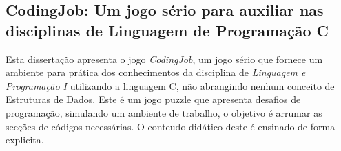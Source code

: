 \subsection{CodingJob: Um jogo sério para auxiliar nas disciplinas de Linguagem de Programação C}

Esta dissertação apresenta o jogo \textit{CodingJob}, um jogo sério que fornece um ambiente para prática dos conhecimentos da disciplina de \textit{Linguagem e Programação I} utilizando a linguagem C, não abrangindo nenhum conceito de Estruturas de Dados. Este é um jogo puzzle que apresenta desafios de programação, simulando um ambiente de trabalho, o objetivo é arrumar as secções de códigos necessárias. O conteudo didático deste é ensinado de forma explicita. \cite{costa2023condigjob}



